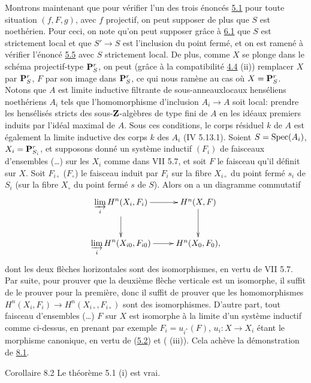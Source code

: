 \documentclass[10pt]{../fichiers-configuration-latex/smfart}
\begin{document}
Montrons maintenant que pour vérifier l'un des trois énoncés \hyperref[XII.thm5.1]{5.1} pour
toute situation $(f,F,g)$, avec $f$ projectif, on peut supposer de
plus que $S$ est noethérien. Pour ceci, on note qu'on peut supposer
grâce à \hyperref[XII.lem6.1]{6.1} que $S$ est strictement local et que $S'\rightarrow S$ est
l'inclusion du point fermé, et on est ramené à vérifier l'énoncé \hyperref[XII.cor5.5]{5.5}
avec $S$ strictement local. De plus, comme $X$ se plonge dans le
schéma projectif-type $\mathbf{P}^r_S$, on peut (grâce à la compatibilité \hyperref[XII.prop4.4]{4.4}
(ii)) remplacer $X$ par $\mathbf{P}^r_S$, $F$ par son image dans $\mathbf{P}^r_S$,
ce qui nous ramène au cas où $X=\mathbf{P}^r_S$. Notons que $A$ est limite
inductive filtrante de sous-anneaux\pageoriginale locaux henséliens
noethériens $A_i$ tels que l'homomorphisme d'inclusion $A_i\rightarrow
A$ soit local: prendre les hensélisés stricts des sous-$\mathbf{Z}$-algèbres
de type fini de $A$ en les idéaux premiers induits par l'idéal maximal
de $A$. Sous ces conditions, le corps résiduel $k$ de $A$ est
également la limite inductive des corps $k$ des $A_i$ (\EGA IV
5.13.1). Soient $S=\operatorname{Spec} (A_i)$, $X_i=\mathbf{P}^r_{S_i}$, et supposons
donné un système inductif $(F_i)$ de faisceaux d'ensembles
(\resp\ldots) sur les $X_i$ comme dans VII 5.7, et soit $F$ le
faisceau qu'il définit sur $X$. Soit $F_{i\circ}$ (\resp $F_{\circ}$)
le faisceau induit par $F_i$ sur la fibre $X_{i\circ}$ du point fermé
$s_i$ de $S_i$ (\resp sur la fibre $X_{\circ}$ du point fermé $s$ de
$S$). Alors on a un diagramme commutatif
$$
\xymatrix{
\displaystyle\mathop{\varinjlim}_{i} H^{n}(X_i,F_i) \ar[r] \ar[d]&
H^{n}(X,F)\ar[d]\\ 
\displaystyle\mathop{\varinjlim}_{i} H^{n}(X_{i0},F_{i0}) \ar[r] &
H^{n}(X_0,F_0), 
}
$$
dont les deux flèches horizontales sont des isomorphismes, en vertu de
VII 5.7. Par suite, pour prouver que la deuxième flèche verticale est
un isomorphe, il suffit de le prouver pour la première, donc il suffit
de prouver que les homomorphismes $H^n(X_i,F_i)\rightarrow
H^n(X_{i\circ},F_{i\circ})$ sont des isomorphismes. D'autre part, tout
faisceau d'ensembles (\resp\ldots) $F$ sur $X$ est isomorphe à la
limite d'un système inductif comme ci-dessus, en prenant par exemple
$F_i=u_{i^{\ast}}(F)$, $u_i:X\rightarrow X_i$ étant le morphisme
canonique, en vertu de (\hyperref[XII.cor5.2]{5.2}) et (
(iii)). Cela achève la 
démonstration de \hyperref[XII.lem8.1]{8.1}.

\begin{enonce*}{Corollaire 8.2}
Le théorème {\rm 5.1 (i)} est vrai.
\end{enonce*}
\end{document}
